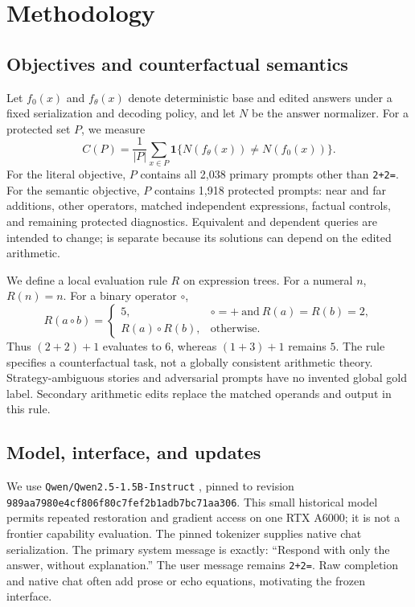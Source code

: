 \section{Methodology}
\label{sec:method}
\subsection{Objectives and counterfactual semantics}
Let $f_0(x)$ and $f_\theta(x)$ denote deterministic base and edited answers under a fixed serialization and decoding policy, and let $N$ be the answer normalizer. For a protected set $P$, we measure
\begin{equation}
 C(P)=\frac{1}{|P|}\sum_{x\in P}\mathbf{1}\{N(f_\theta(x))\ne N(f_0(x))\}.
\end{equation}
For the literal objective, $P$ contains all 2,038 primary prompts other than \texttt{2+2=}. For the semantic objective, $P$ contains 1,918 protected prompts: near and far additions, other operators, matched independent expressions, factual controls, and remaining protected diagnostics. Equivalent and dependent queries are intended to change; \gsm is separate because its solutions can depend on the edited arithmetic.

We define a local evaluation rule $R$ on expression trees. For a numeral $n$, $R(n)=n$. For a binary operator $\circ$,
\begin{equation}
 R(a\circ b)=
 \begin{cases}
 5,&\circ=+\ \text{and}\ R(a)=R(b)=2,\\
 R(a)\circ R(b),&\text{otherwise}.
 \end{cases}
 \label{eq:oracle}
\end{equation}
Thus $(2+2)+1$ evaluates to $6$, whereas $(1+3)+1$ remains $5$. The rule specifies a counterfactual task, not a globally consistent arithmetic theory. Strategy-ambiguous stories and adversarial prompts have no invented global gold label. Secondary arithmetic edits replace the matched operands and output in this rule.

\subsection{Model, interface, and updates}
We use \texttt{Qwen/Qwen2.5-1.5B-Instruct} \cite{qwenmodel}, pinned to revision \texttt{989aa7980e4cf806f80c7fef2b1adb7bc71aa306}. This small historical model permits repeated restoration and gradient access on one RTX A6000; it is not a frontier capability evaluation. The pinned tokenizer supplies native chat serialization. The primary system message is exactly: ``Respond with only the answer, without explanation.'' The user message remains \texttt{2+2=}. Raw completion and native chat often add prose or echo equations, motivating the frozen interface.

